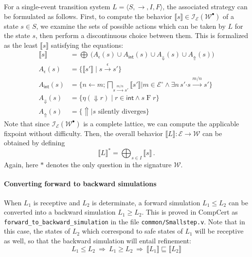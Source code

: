 \documentclass[11pt,oneside]{book}
\theoremstyle{definition}
\newcommand{\kw}[1]{\ensuremath{ \mathsf{#1} }}
\newcommand{\bdot}{\boldsymbol{\cdot}}
\newcommand{\que}{\circ}         %
\newcommand{\ans}{\bullet}       %
\begin{document}
For a single-event transition system
$L = \langle S, {\rightarrow}, I, F \rangle$,
the associated strategy
can be formulated as follows.
First,
to compute the behavior
$\llbracket s \rrbracket \in \mathcal{I}_\mathcal{E}(\mathcal{W}^\ans)$
of a state $s \in S$,
we examine the sets of possible actions
which can be taken by $L$
for the state $s$,
then perform a discontinuous choice between them.
This is formalized as the least $\llbracket s \rrbracket$
satisfying the equations:
\begin{align*}
  \llbracket s \rrbracket &=
    \bigoplus \:
    \big(
      A_\epsilon(s) \cup A_\kw{int}(s) \cup
      A_\Downarrow(s) \cup A_\Uparrow(s)
    \big)
  \\
  A_\epsilon(s) &=
    \{ \llbracket s' \rrbracket \mid s \stackrel{\epsilon}{\rightarrow} s' \}
  \\
  A_\kw{int}(s) &=
    \Big\{
      n \mathbin\leftarrow m \mathbin;
      \bigsqcap_{s \stackrel{m/n}{\longrightarrow} s'}
	\llbracket s' \rrbracket
    \mathrel{\Big\vert}
      m \in \mathcal{E}^\que \wedge
      \exists n \, s' \bdot s \stackrel{m/n}{\longrightarrow} s'
    \Big\}
  \\
  A_\Downarrow(s) &=
    \{ \eta({\Downarrow} r) \mid r \in \kw{int} \wedge s \mathrel{F} r \}
  \\
  A_\Uparrow(s) &=
    \{ {\Uparrow} \mid s \text{ silently diverges} \}
\end{align*}
Note that since $\mathcal{I}_\mathcal{E}(\mathcal{W}^\ans)$
is a complete lattice,
we can compute the applicable fixpoint without difficulty.
Then,
the overall behavior
$\llbracket L \rrbracket : \mathcal{E} \rightarrow \mathcal{W}$
can be obtained by defining
\[
  \llbracket L \rrbracket^* = \bigoplus_{s \in I} \llbracket s \rrbracket
  \,.
\]
Again, here $*$ denotes the only question in the signature $\mathcal{W}$.

\paragraph{Converting forward to backward simulations}

When $L_1$ is receptive and $L_2$ is determinate,
a forward simulation $L_1 \le L_2$ can be converted
into a backward simulation $L_1 \ge L_2$.
This is proved in CompCert
as \texttt{forward\_to\_backward\_simulation}
in the file \texttt{common/Smallstep.v}.
Note that in this case,
the states of $L_2$ which correspond
to safe states of $L_1$ will be receptive as well,
so that the backward simulation will entail refinement:
\[
  L_1 \le L_2 \: \Rightarrow \:
  L_1 \ge L_2 \: \Rightarrow \:
  \llbracket L_1 \rrbracket \sqsubseteq \llbracket L_2 \rrbracket
\]
\end{document}
